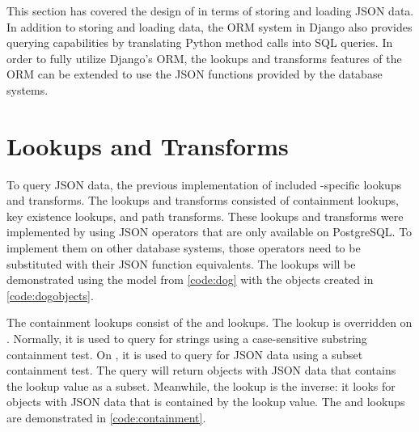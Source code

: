 This section has covered the design of  in terms of storing and
loading JSON data. In addition to storing and loading data, the ORM system in
Django also provides querying capabilities by translating Python method calls
into SQL  queries. In order to fully utilize Django's ORM, the
lookups and transforms features of the ORM can be extended to use the JSON
functions provided by the database systems.

\section{ Lookups and Transforms}

To query JSON data, the previous implementation of  included
-specific lookups and transforms. The lookups and transforms
consisted of containment lookups, key existence lookups, and path transforms.
These lookups and transforms were implemented by using JSON operators that are
only available on PostgreSQL. To implement them on other database systems,
those operators need to be substituted with their JSON function equivalents.
The lookups will be demonstrated using the  model from
\autoref{code:dog} with the objects created in \autoref{code:dogobjects}.

\noindent
\begin{minipage}{\linewidth}

\end{minipage}

\noindent
\begin{minipage}{\linewidth}

\end{minipage}

The containment lookups consist of the  and 
lookups. The  lookup is overridden on .
Normally, it is used to query for strings using a case-sensitive substring
containment test. On , it is used to query for JSON data using
a subset containment test. The query will return objects with JSON data that
contains the lookup value as a subset. Meanwhile, the 
lookup is the inverse: it looks for objects with JSON data that is contained by
the lookup value. The  and  lookups are
demonstrated in \autoref{code:containment}.

